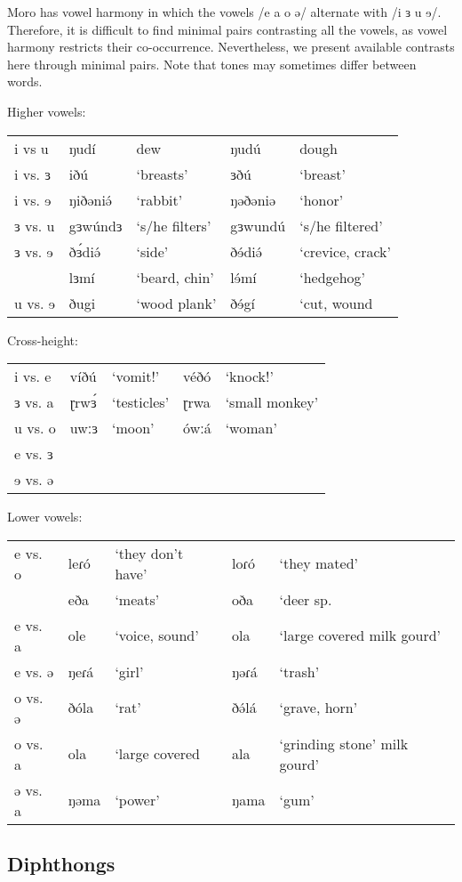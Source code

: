 Moro has vowel harmony in which the vowels /e a o ə/ alternate with /i ɜ u ɘ/. Therefore, it is difficult to find minimal pairs contrasting all the vowels, as vowel harmony restricts their co-occurrence. Nevertheless, we present available contrasts here through minimal pairs. Note that tones may sometimes differ between words. 

\ea Higher vowels:
\begin{tabular}[t]{lllll}
i vs u		&	ŋudí	&	dew				&	ŋudú	&	dough\\
i vs. ɜ		&	iðú		&	‘breasts’		&	ɜðú		&	‘breast’\\
i vs. ɘ		&	ŋiðəniə́	&	‘rabbit’ 		&	ŋəðəniə  &	‘honor’	 \\
ɜ vs. u		&	gɜwúndɜ	&	‘s/he filters’	&	gɜwundú	&	‘s/he filtered’\\
ɜ vs. ɘ		&	ðɜ́diə́	&	‘side’			&	ðɘ́diə́	&	‘crevice, crack’\\
			&	lɜmí	&	‘beard, chin’	&	lɘ́mí	&	‘hedgehog’	\\
u vs. ɘ		&	ðugi		&	‘wood plank’		&	ðɘ́gí	&	‘cut, wound	
\end{tabular}\label{ex:ch2:3}
\ex 
Cross-height:\\
\begin{tabular}[t]{lllll}
i vs. e		&	víðú		&	‘vomit!’		&	véðó		&	‘knock!’\\
ɜ vs. a		&	ɽrwɜ́	&	‘testicles’	&	ɽrwa	&	‘small monkey’\\
u vs. o		&	uwːɜ	&	‘moon’		&	ówːá	&	‘woman’\\
e vs. ɜ\\
ɘ vs. ə   	
\end{tabular}\label{ex:ch2:4}
\ex 
Lower vowels:\\
\begin{tabular}[t]{lllll}
e vs. o	&	leɾó	&	‘they don’t have’	&	loɾó	&	‘they mated’\\
		&	eða		&	‘meats’				&	oða		&	‘deer sp.\\
e vs. a	&	ole		&	‘voice, sound’		&	ola		&	‘large covered milk gourd’\\
e vs. ə	&	ŋeɾá	&	‘girl’				&	ŋəɾá	&	‘trash’	\\
o vs. ə	&	ðóla	&	‘rat’				&	ðə́lá		&	‘grave, horn’\\
o vs. a	&	ola		&	‘large covered		&	ala		&	‘grinding stone’
 milk gourd’\\
ə vs. a	&	ŋəma	&	‘power’				&	ŋama	&	‘gum’	
\end{tabular}\label{ex:ch2:5}
\z

\subsection{Diphthongs}

